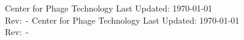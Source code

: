 

	{\thepage\quad}
	{}
	{}
	{}
	{}
	{\quad\thepage}
	{Center for Phage Technology}
	{}
	{Last Updated: \today\ \\Rev: \texttt{\GITBranch-\VCRevisionMod}}
	{Center for Phage Technology}
	{}
	{Last Updated: \today\ \\Rev: \texttt{\GITBranch-\VCRevisionMod}}

